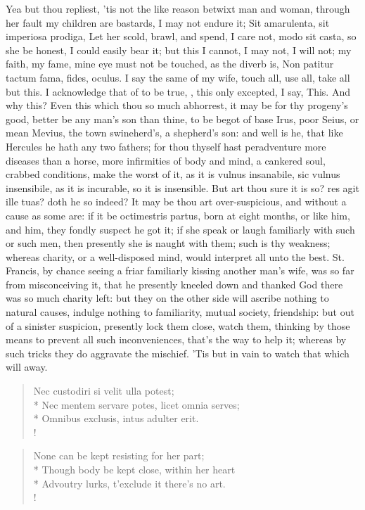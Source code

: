 Yea but thou repliest, 'tis not the like reason betwixt man and woman,
through her fault my children are bastards, I may not endure it;
Sit amarulenta, sit imperiosa prodiga, \etc{} Let her scold, brawl,
and spend, I care not, modo sit casta, so she be honest, I could easily
bear it; but this I cannot, I may not, I will not; my faith, my fame,
mine eye must not be touched, as the diverb is, Non patitur tactum
fama, fides, oculus. I say the same of my wife, touch all, use all,
take all but this. I acknowledge that of \Seneca to be true, , this only excepted, I say, This. And why
this? Even this which thou so much abhorrest, it may
be for thy progeny's good,  better be any man's son than thine,
to be begot of base Irus, poor Seius, or mean Mevius, the town
swineherd's, a shepherd's son: and well is he, that like Hercules he
hath any two fathers; for thou thyself hast peradventure more diseases
than a horse, more infirmities of body and mind, a cankered soul,
crabbed conditions, make the worst of it, as it is vulnus insanabile,
sic vulnus insensibile, as it is incurable, so it is insensible. But
art thou sure it is so? res agit ille tuas? doth he so indeed? It
may be thou art over-suspicious, and without a cause as some are: if it
be octimestris partus, born at eight months, or like him, and him, they
fondly suspect he got it; if she speak or laugh familiarly with such or
such men, then presently she is naught with them; such is thy weakness;
whereas charity, or a well-disposed mind, would interpret all unto the
best. St. Francis, by chance seeing a friar familiarly kissing another
man's wife, was so far from misconceiving it, that he presently kneeled
down and thanked God there was so much charity left: but they on the
other side will ascribe nothing to natural causes, indulge nothing to
familiarity, mutual society, friendship: but out of a sinister
suspicion, presently lock them close, watch them, thinking by those
means to prevent all such inconveniences, that's the way to help it;
whereas by such tricks they do aggravate the mischief. 'Tis but in vain
to watch that which will away.
%
\begin{latin}
\begin{verse}%
Nec custodiri si velit ulla potest;\\*
Nec mentem servare potes, licet omnia serves;\\*
Omnibus exclusis, intus adulter erit.\\!
\end{verse}%
\end{latin}
\translationrule%
\begin{verse}%
None can be kept resisting for her part;\\*
Though body be kept close, within her heart\\*
Advoutry lurks, t'exclude it there's no art.\\!
\end{verse}%
%

